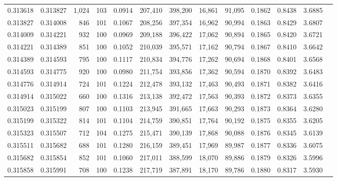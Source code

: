 \begin{tabular}{rrrrrrrrrrrrr}
0.313618 & 0.313827 & 1,024 & 103 &                                     0.0914 & 207,410 & 398,200 &  16,861 &  91,095 & 0.1862 & 0.8438 & 3.6885 \\
0.313827 & 0.314008 &   846 & 101 &                                     0.1067 & 208,256 & 397,354 &  16,962 &  90,994 & 0.1863 & 0.8429 & 3.6807 \\
0.314009 & 0.314221 &   932 & 100 &                                     0.0969 & 209,188 & 396,422 &  17,062 &  90,894 & 0.1865 & 0.8420 & 3.6721 \\
0.314221 & 0.314389 &   851 & 100 &                                     0.1052 & 210,039 & 395,571 &  17,162 &  90,794 & 0.1867 & 0.8410 & 3.6642 \\
0.314389 & 0.314593 &   795 & 100 &                                     0.1117 & 210,834 & 394,776 &  17,262 &  90,694 & 0.1868 & 0.8401 & 3.6568 \\
0.314593 & 0.314775 &   920 & 100 &                                     0.0980 & 211,754 & 393,856 &  17,362 &  90,594 & 0.1870 & 0.8392 & 3.6483 \\
0.314776 & 0.314914 &   724 & 101 &                                     0.1224 & 212,478 & 393,132 &  17,463 &  90,493 & 0.1871 & 0.8382 & 3.6416 \\
0.314914 & 0.315022 &   660 & 100 &                                     0.1316 & 213,138 & 392,472 &  17,563 &  90,393 & 0.1872 & 0.8373 & 3.6355 \\
0.315023 & 0.315199 &   807 & 100 &                                     0.1103 & 213,945 & 391,665 &  17,663 &  90,293 & 0.1873 & 0.8364 & 3.6280 \\
0.315199 & 0.315322 &   814 & 101 &                                     0.1104 & 214,759 & 390,851 &  17,764 &  90,192 & 0.1875 & 0.8355 & 3.6205 \\
0.315323 & 0.315507 &   712 & 104 &                                     0.1275 & 215,471 & 390,139 &  17,868 &  90,088 & 0.1876 & 0.8345 & 3.6139 \\
0.315511 & 0.315682 &   688 & 101 &                                     0.1280 & 216,159 & 389,451 &  17,969 &  89,987 & 0.1877 & 0.8336 & 3.6075 \\
0.315682 & 0.315854 &   852 & 101 &                                     0.1060 & 217,011 & 388,599 &  18,070 &  89,886 & 0.1879 & 0.8326 & 3.5996 \\
0.315858 & 0.315991 &   708 & 100 &                                     0.1238 & 217,719 & 387,891 &  18,170 &  89,786 & 0.1880 & 0.8317 & 3.5930 \\

\end{tabular}
